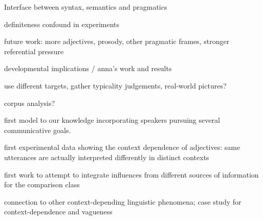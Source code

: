 Interface between syntax, semantics and pragmatics

definiteness confound in experiments

future work: more adjectives, prosody, other pragmatic frames, stronger referential pressure

developmental implications / anna's work and results

use different targets, gather typicality judgements, real-world pictures?

corpus analysis?

first model to our knowledge incorporating speakers pursuing several communicative goals. 

first experimental data showing the context dependence of adjectives: same utterances are actually interpreted differently in distinct contexts

first work to attempt to integrate influences from different sources of information for the comparison class


connection to other context-depending linguistic phenomena; case study for context-dependence and vagueness

